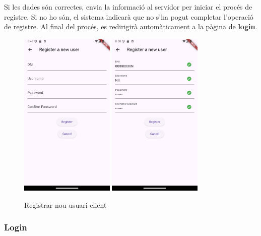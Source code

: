 \documentclass[a4paper,12pt,twoside]{ThesisStyle}
\begin{document}
Si les dades són correctes, envia la informació al servidor per iniciar el procés de registre. Si no ho són, el sistema indicarà que no s'ha pogut completar l'operació de registre. Al final del procés, es redirigirà automàticament a la pàgina de \textbf{login}.

\begin{figure}[h]
    \centering
    \includegraphics[width=0.4\textwidth]{imatges/registration.png}
    \includegraphics[width=0.4\textwidth]{imatges/registrationwithvalue.png}
    \caption{Registrar nou usuari client}
    \label{fig: registrar nou usuari client}
\end{figure}

\clearpage

\subsubsection{Login}
\label{subsubsec:Login}
\end{document}
